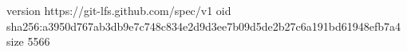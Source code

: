version https://git-lfs.github.com/spec/v1
oid sha256:a3950d767ab3db9e7c748c834e2d9d3ee7b09d5de2b27c6a191bd61948efb7a4
size 5566
